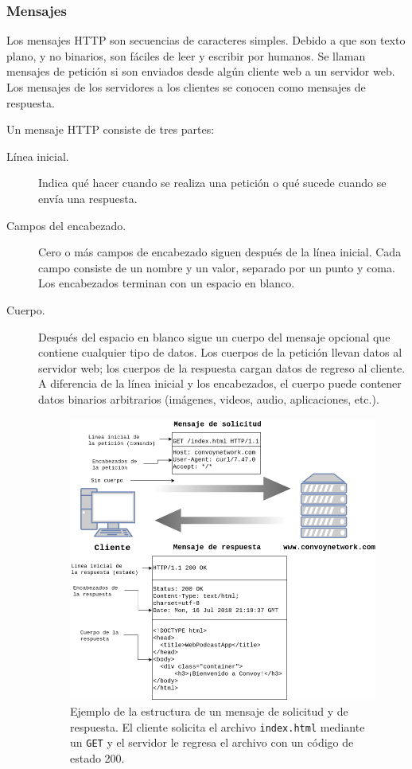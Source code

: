 \subsubsection{Mensajes}
\label{\detokenize{chapter_one/rest:mensajes}}
Los mensajes HTTP son secuencias de caracteres simples. Debido a que son
texto plano, y no binarios, son fáciles de leer y escribir por humanos.
Se llaman mensajes de petición si son enviados desde algún cliente web a
un servidor web. Los mensajes de los servidores a los clientes se
conocen como mensajes de respuesta.

Un mensaje HTTP consiste de tres partes:
\begin{description}
\item[{Línea inicial.}] \leavevmode
Indica qué hacer cuando se realiza una petición o qué sucede cuando
se envía una respuesta.

\item[{Campos del encabezado.}] \leavevmode
Cero o más campos de encabezado siguen después de la línea inicial.
Cada campo consiste de un nombre y un valor, separado por un punto y
coma. Los encabezados terminan con un espacio en blanco.

\item[{Cuerpo.}] \leavevmode
Después del espacio en blanco sigue un cuerpo del mensaje opcional
que contiene cualquier tipo de datos. Los cuerpos de la petición
llevan datos al servidor web; los cuerpos de la respuesta cargan
datos de regreso al cliente. A diferencia de la línea inicial y los
encabezados, el cuerpo puede contener datos binarios arbitrarios
(imágenes, videos, audio, aplicaciones, etc.).

\begin{figure}
    \centering
    \includegraphics[scale=0.5]{figures/http_message.png}
    \caption{Ejemplo de la estructura de un mensaje de solicitud y de respuesta. El cliente solicita el archivo \texttt{index.html} mediante
    un \texttt{GET} y el servidor le regresa el archivo con un código de estado
    200.}
    \label{http-message}
\end{figure}


\end{description}
